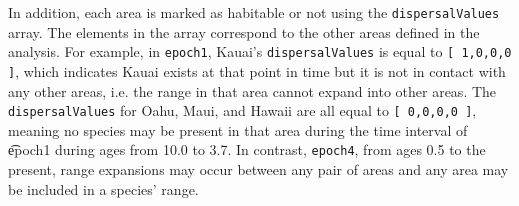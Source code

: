 In addition, each area is marked as habitable or not using the {\tt dispersalValues} array.
The elements in the array correspond to the other areas defined in the analysis.
For example, in {\tt epoch1}, Kauai's {\tt dispersalValues} is equal to {\tt [ 1,0,0,0 ]}, which indicates Kauai exists at that point in time but it is not in contact with any other areas, i.e. the range in that area cannot expand into other areas.
The {\tt dispersalValues} for Oahu, Maui, and Hawaii are all equal to {\tt [ 0,0,0,0 ]}, meaning no species may be present in that area during the time interval of {\t epoch1} during ages from 10.0 to 3.7. In contrast, {\tt epoch4}, from ages 0.5 to the present, range expansions may occur between any pair of areas and any area may be included in a species' range.




